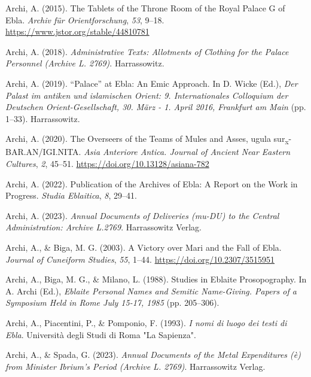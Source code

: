 \documentclass[
]{book}
\newlength{\cslhangindent}
\newlength{\cslentryspacingunit} %
\newenvironment{CSLReferences}[2] %
 {%
  \setlength{\parindent}{0pt}
  \ifodd #1
  \let\oldpar\par
  \def\par{\hangindent=\cslhangindent\oldpar}
  \fi
  \setlength{\parskip}{#2\cslentryspacingunit}
 }%
 {}
\begin{document}
\begin{CSLReferences}{1}{0}
\leavevmode{}%
Archi, A. (2015). The {Tablets} of the {Throne Room} of the {Royal Palace G} of {Ebla}. \emph{Archiv f{ü}r Orientforschung}, \emph{53}, 9--18. \url{https://www.jstor.org/stable/44810781}

\leavevmode{}%
Archi, A. (2018). \emph{Administrative {Texts}: {Allotments} of {Clothing} for the {Palace Personnel} ({Archive L}. 2769)}. Harrassowitz.

\leavevmode{}%
Archi, A. (2019). {{``Palace''} at Ebla: An Emic Approach}. In D. Wicke (Ed.), \emph{{Der Palast im antiken und islamischen Orient: 9. Internationales Colloquium der Deutschen Orient-Gesellschaft, 30. M{ä}rz - 1. April 2016, Frankfurt am Main}} (pp. 1--33). Harrassowitz.

\leavevmode{}%
Archi, A. (2020). {The Overseers of the Teams of Mules and Asses, ugula sur\textsubscript{x}-BAR.AN/IGI.NITA}. \emph{Asia Anteriore Antica. Journal of Ancient Near Eastern Cultures}, \emph{2}, 45--51. \url{https://doi.org/10.13128/asiana-782}

\leavevmode{}%
Archi, A. (2022). Publication of the {Archives} of {Ebla}: {A Report} on the {Work} in {Progress}. \emph{Studia Eblaitica}, \emph{8}, 29--41.

\leavevmode{}%
Archi, A. (2023). \emph{Annual {Documents} of {Deliveries} (mu-{DU}) to the {Central Administration}: {Archive L}.2769}. Harrassowitz Verlag.

\leavevmode{}%
Archi, A., \& Biga, M. G. (2003). A {Victory} over {Mari} and the {Fall} of {Ebla}. \emph{Journal of Cuneiform Studies}, \emph{55}, 1--44. \url{https://doi.org/10.2307/3515951}

\leavevmode{}%
Archi, A., Biga, M. G., \& Milano, L. (1988). Studies in {Eblaite Prosopography}. In A. Archi (Ed.), \emph{Eblaite {Personal Names} and {Semitic Name-Giving}. {Papers} of a {Symposium Held} in {Rome July} 15-17, 1985} (pp. 205--306).

\leavevmode{}%
Archi, A., Piacentini, P., \& Pomponio, F. (1993). \emph{{I nomi di luogo dei testi di Ebla}}. Universit{à} degli Studi di Roma "La Sapienza".

\leavevmode{}%
Archi, A., \& Spada, G. (2023). \emph{Annual {Documents} of the {Metal Expenditures} ({è}) from {Minister Ibrium}'s {Period} ({Archive L}. 2769)}. Harrassowitz Verlag.


\end{CSLReferences}
\end{document}
